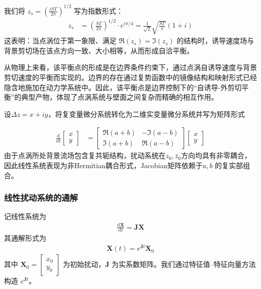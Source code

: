 我们将 $z_s = \left( \frac{iS\Gamma}{2\pi} \right)^{1/2}$ 写为指数形式：
\begin{align*}
    z_s &= \left( \frac{S\Gamma}{2\pi} \right)^{1/2} \cdot e^{i\pi/4} = \frac{1}{\sqrt{2}} \sqrt{ \frac{S\Gamma}{\pi} } (1+i)
\end{align*}
这表明：当点涡位于第一象限、满足 $\Re(z_s) = \Im(z_s)$ 的结构时，诱导速度场与背景剪切场在该点方向一致、大小相等，从而形成自洽平衡。

从物理上来看，该平衡点的形成是在边界条件约束下，通过点涡自诱导速度与背景剪切速度的平衡而实现的。边界的存在通过复势函数中的镜像结构和映射形式已经隐含地施加在动力学系统中。因此，该平衡点是边界控制下的“自诱导-外剪切平衡”的典型产物，体现了点涡系统与壁面之间复杂而精确的相互作用。

设$\Delta z=x+iy$，将复变量微分系统转化为二维实变量微分系统并写为矩阵形式

\begin{align*}
    \frac{\mathrm{d}}{\mathrm{d}t}
\begin{bmatrix}
    x \\
    y 
\end{bmatrix}
&=
\begin{bmatrix}
    \Re(a+b) & -\Im(a-b) \\
    \Im(a+b) &  \Re(a-b)
\end{bmatrix}
\begin{bmatrix}
    x \\
    y 
\end{bmatrix}
\end{align*}
由于点涡所处背景流场包含复共轭结构，扰动系统在$z_{0},\bar{z}_{0}$方向均具有非零耦合，因此线性系统表现为非Hermitian耦合形式，Jacobian矩阵依赖于$a,b$ 的复实部组合。

\subsubsection{线性扰动系统的通解}

记线性系统为
\begin{align*}
    \frac{\mathrm{d}\bm{X}}{\mathrm{d}t} = \bm{JX}
\end{align*}
其通解形式为
\begin{align*}
    \bm{X}(t) = e^{\bm{J}t} \bm{X}_{0}
\end{align*}
其中 $\bm{X}_0 = \begin{bmatrix} x_0 \\ y_0 \end{bmatrix}$ 为初始扰动，$\bm{J}$ 为实系数矩阵。我们通过特征值–特征向量方法构造 $e^{\bm{J}t}$。

